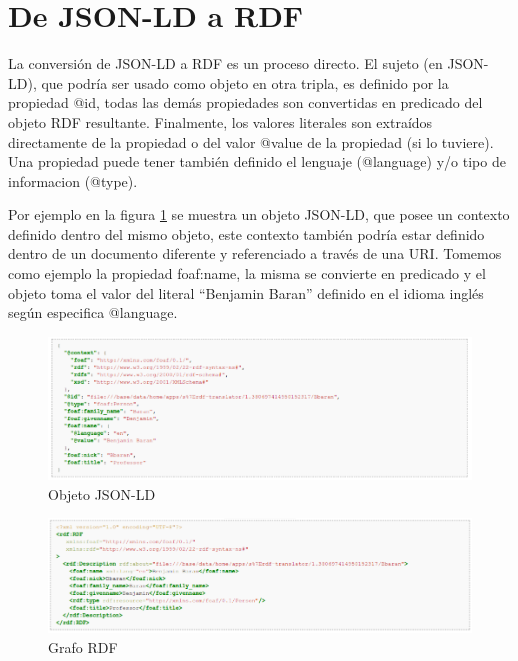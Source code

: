 \section{De JSON-LD a RDF}

La conversión de JSON-LD a RDF es un proceso directo. El sujeto (en JSON-LD), que podría ser usado como objeto en otra tripla, es definido por la propiedad @id, todas las demás propiedades son convertidas en predicado del objeto RDF resultante. Finalmente, los valores literales son extraídos directamente de la propiedad o del valor @value de la propiedad (si lo tuviere). Una propiedad puede tener también definido el lenguaje (@language) y/o tipo de informacion (@type).

Por ejemplo en la figura \ref{img:EjemploBaranJSONLD} se muestra un objeto JSON-LD, que posee un contexto definido dentro del mismo objeto, este contexto también podría estar definido dentro de un documento diferente y referenciado a través de una URI. Tomemos como ejemplo la propiedad foaf:name, la misma se convierte en predicado y el objeto toma el valor del literal “Benjamin Baran” definido en el idioma inglés según especifica @language.



\begin{figure}[h!]
    \centering
    \includegraphics[width=150mm]{figuras/BaranJSONLD.png}
    \caption{Objeto JSON-LD}
    \label{img:EjemploBaranJSONLD}
    \end{figure}




\begin{figure}[h!]
    \centering
    \includegraphics[width=150mm]{figuras/BaranRDF.png}
    \caption{Grafo RDF}
    \label{img:EjemploBaranRDF}
    \end{figure}



